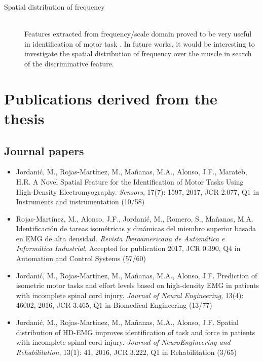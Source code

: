 \begin{description}
\item[Spatial distribution of frequency] \hfill \\
	Features extracted from frequency/scale domain proved to be very useful in identification of motor task \citep{Oskoei2007}. In future works, it would be interesting to investigate the spatial distribution of frequency over the muscle in search of the discriminative feature.

\end{description}

\section {Publications derived from the thesis}
\subsection{Journal papers}

\begin{itemize}
\item Jordanić, M., Rojas-Martínez, M., Mañanas, M.A., Alonso, J.F., Marateb, H.R. A Novel Spatial Feature for the Identification of Motor Tasks Using High-Density Electromyography. \textit{Sensors}, 17(7): 1597, 2017, JCR 2.077, Q1 in Instruments and instrumentation (10/58)

\item Rojas-Martínez, M., Alonso, J.F., Jordanić, M., Romero, S., Mañanas, M.A. Identificación de tareas isométricas y dinámicas del miembro superior basada en EMG de alta densidad. \textit{Revista Iberoamericana de Automática e Informática Industrial}, Accepted for publication 2017, JCR 0.390, Q4 in Automation and Control Systems (57/60)

\item Jordanić, M., Rojas-Martínez, M., Mañanas, M.A., Alonso, J.F. Prediction of isometric motor tasks and effort levels based on high-density EMG in patients with incomplete spinal cord injury. \textit{Journal of Neural Engineering}, 13(4): 46002, 2016, JCR 3.465, Q1 in Biomedical Engineering (13/77)

\item Jordanić, M., Rojas-Martínez, M., Mañanas, M.A., Alonso, J.F. Spatial distribution of HD-EMG improves identification of task and force in patients with incomplete spinal cord injury. \textit{Journal of NeuroEngineering and Rehabilitation}, 13(1): 41, 2016, JCR 3.222, Q1 in Rehabilitation (3/65)
\end{itemize}


